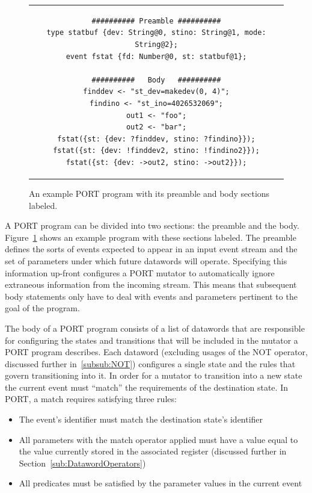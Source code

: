 \begin{figure}[h]
\centering
\begin{tabular}{c}
\begin{lstlisting}
########## Preamble ##########
type statbuf {dev: String@0, stino: String@1, mode: String@2};
event fstat {fd: Number@0, st: statbuf@1};

##########   Body   ##########
finddev <- "st_dev=makedev(0, 4)";
findino <- "st_ino=4026532069";
out1 <- "foo";
out2 <- "bar";
fstat({st: {dev: ?finddev, stino: ?findino}});
fstat({st: {dev: !finddev2, stino: !findino2}});
fstat({st: {dev: ->out2, stino: ->out2}});
\end{lstlisting}
\end{tabular}
\caption{An example PORT program with its preamble and body sections
  labeled.}
\label{lst:PreambleBody}
\end{figure}



A PORT program can be divided into two sections: the preamble and the body.
Figure~\ref{lst:PreambleBody} shows an example program with these sections
labeled.
The preamble defines the sorts of events
expected
to appear in an input event stream and the set of parameters
under which future datawords will operate.  Specifying this information
up-front configures a PORT mutator to
automatically ignore extraneous information from the incoming stream.  This
means that subsequent body statements only have to deal with events and
parameters pertinent to the goal of the program.

The body of a PORT program consists of a list of datawords that
are responsible for configuring the states and transitions
that will be included in the mutator a PORT program describes.
Each dataword (excluding usages of the NOT operator, discussed further
in~\ref{subsub:NOT}) configures a single
state and the rules that govern transitioning into it.
In order for a mutator to transition into a new state
the current event must ``match'' the requirements of the destination state.
In PORT, a match requires satisfying three rules:

\begin{itemize}
\item{The event's identifier must match the destination state's identifier}
\item{All parameters with the match operator applied must have a value equal to
  the value currently stored in the associated register (discussed further
    in Section~\ref{sub:DatawordOperators})}
\item{All predicates must be satisfied by the parameter values in the
  current event}
\end{itemize}





